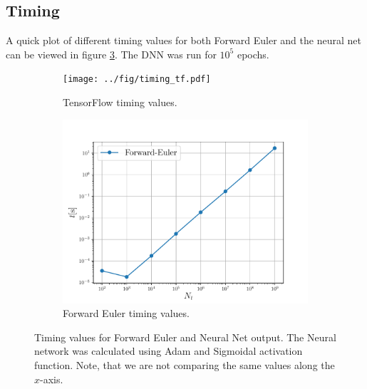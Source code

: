 \subsection{Timing}
A quick plot of different timing values for both Forward Euler and the neural net can be viewed in figure \ref{fig:tf-fw-timing-values}. The DNN was run for $10^5$ epochs.
\begin{figure}[h!tb]
    \centering
    \begin{subfigure}{0.5\textwidth}
        \centering
        \texttt{[image: ../fig/timing\_tf.pdf]}
        \caption{TensorFlow timing values.}
        \label{fig:tf-timing}
    \end{subfigure}
    \begin{subfigure}{0.5\textwidth}
        \centering
        \includegraphics[scale=0.5]{../fig/timing_fw.pdf}
        \caption{Forward Euler timing values.}
        \label{fig:fw-timing}
    \end{subfigure}
    \caption{Timing values for Forward Euler and Neural Net output. The Neural network was calculated using Adam and Sigmoidal activation function. Note, that we are not comparing the same values along the $x$-axis.}
    \label{fig:tf-fw-timing-values}
\end{figure}

